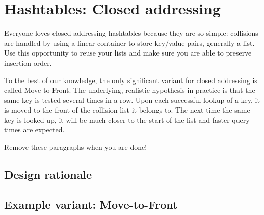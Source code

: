 \chapter{Hashtables: Closed addressing}\label{chap:hashtables:closed}

Everyone loves closed addressing hashtables because they are so simple: collisions are handled by using a linear container to store key/value pairs, generally a list. Use this opportunity to reuse your lists and make sure you are able to preserve insertion order. 

To the best of our knowledge, the only significant variant for closed addressing is called Move-to-Front. The underlying, realistic hypothesis in practice is that the same key is tested several times in a row. Upon each successful lookup of a key, it is moved to the front of the collision list it belongs to. The next time the same key is looked up, it will be much closer to the start of the list and faster query times are expected. 

Remove these paragraphs when you are done!

\section{Design rationale}

\section{Example variant: Move-to-Front}

